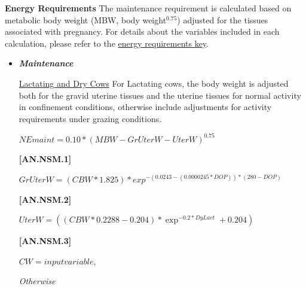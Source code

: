 \documentclass{article}
\begin{document}
\begin{refsection}
    \textbf{ Energy Requirements} The maintenance requirement is calculated based on metabolic body weight (MBW, body weight\(^{0.75}\)) adjusted for the tissues associated with pregnancy. For details about the variables included in each calculation, please refer to the \hyperref[nasemenergykey]{energy requirements key}.
    \vspace{0.2cm}

\begin{itemize}
    \item \textbf{\textit{Maintenance}}
    \vspace{0.2cm}
    
        \underline {Lactating and Dry Cows}
        For Lactating cows, the body weight is adjusted both for the gravid uterine tissues and the uterine tissues for normal activity in confinement conditions, otherwise include adjustments for activity requirements under grazing conditions. 
        
        \vspace{0.25cm}
\begin{center}
    \(NEmaint = 0.10 * (MBW - GrUterW - UterW)^{0.75}\)
\end{center}
\vspace{0.5cm}
            {\raggedleft \textbf{[AN.NSM.1]}\par}
\vspace{0.25cm}

\begin{center}
    \(GrUterW = (CBW * 1.825) * exp^{-(0.0243 - (0.0000245 * DOP))*(280 - DOP)} \)
\end{center}
\vspace{0.5cm}
            {\raggedleft\textbf{[AN.NSM.2]} \par}
\vspace{0.25cm}

\begin{center}
    \(UterW = ((CBW * 0.2288 - 0.204) * \exp^{-0.2 * DyLact} + 0.204)\)
\end{center}
\vspace{0.5cm}
            {\raggedleft\textbf{[AN.NSM.3]} \par}
\vspace{0.25cm}

\begin{center}
    \(CW = inputvariable, \)
\end{center}
\vspace{0.5cm}

\textit{\small Otherwise}
\vspace{0.25cm}


\end{itemize}
\end{refsection}
\end{document}
